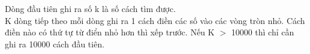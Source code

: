 Dòng đầu tiên ghi ra số k là số cách tìm được.   
\\   K dòng tiếp theo mỗi dòng ghi ra 1 cách điền các số vào các vòng tròn nhỏ. Cách điền nào có thứ tự từ điển nhỏ hơn thì xếp trước. Nếu K $>$ 10000 thì chỉ cần ghi ra 10000 cách đầu tiên.  

\